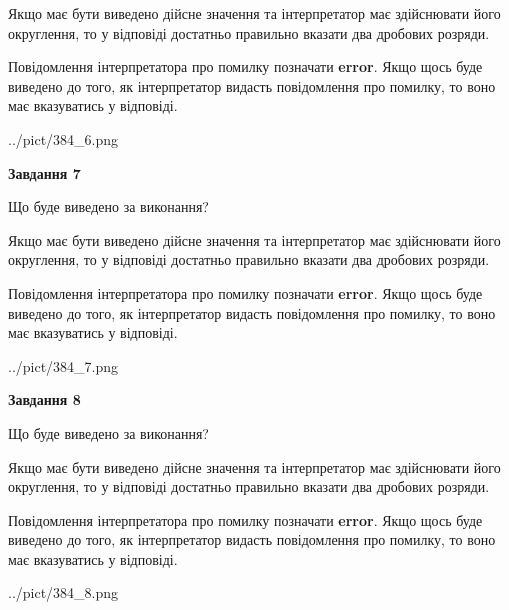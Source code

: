 \documentclass[12pt, ukrainian]{article}
\begin{document}
{\begin {Large}
Якщо має бути виведено дійсне значення та інтерпретатор має здійснювати його округлення, 
то у відповіді достатньо правильно вказати два дробових розряди.

Повідомлення інтерпретатора про помилку позначати \textbf{error}.
Якщо щось буде виведено до того, як інтерпретатор видасть повідомлення про помилку, 
то воно має вказуватись у відповіді. \par

\begin{center}
	{../pict/384_6.png}
\end{center}
\newpage

{\begin {center}\textbf{Завдання 7}\end {center}}\par
Що буде виведено за виконання? \par

Якщо має бути виведено дійсне значення та інтерпретатор має здійснювати його округлення, 
то у відповіді достатньо правильно вказати два дробових розряди.

Повідомлення інтерпретатора про помилку позначати \textbf{error}.
Якщо щось буде виведено до того, як інтерпретатор видасть повідомлення про помилку, 
то воно має вказуватись у відповіді. \par

\begin{center}
	{../pict/384_7.png}
\end{center}
\newpage

{\begin {center}\textbf{Завдання 8}\end {center}}\par
Що буде виведено за виконання? \par

Якщо має бути виведено дійсне значення та інтерпретатор має здійснювати його округлення, 
то у відповіді достатньо правильно вказати два дробових розряди.

Повідомлення інтерпретатора про помилку позначати \textbf{error}.
Якщо щось буде виведено до того, як інтерпретатор видасть повідомлення про помилку, 
то воно має вказуватись у відповіді. \par

\begin{center}
	{../pict/384_8.png}
\end{center}
\newpage


\end{Large}}
\end{document}
